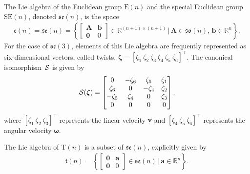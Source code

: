 \begin{example}
    The Lie algebra of the Euclidean group $\text{E}(n)$ and the special Euclidean group $\text{SE}(n)$, denoted $\mathfrak{se}(n)$, is the space
    \begin{align*}
        \mathfrak{e}(n)=\mathfrak{se}(n) = \left\{\begin{bmatrix}
            \mathbf{A} & \mathbf{b} \\ \mathbf{0} & 0
        \end{bmatrix} \in \mathbb{R}^{(n+1)\times(n+1)} \,\biggl|\, \mathbf{A}\in\mathfrak{so}(n),\, \mathbf{b}\in\mathbb{R}^n\right\}.
    \end{align*}
    For the case of $\mathfrak{se}(3)$, elements of this Lie algebra are frequently represented as six-dimensional vectors, called twists, $\boldsymbol{\zeta} = [\zeta_1\ \zeta_2\ \zeta_3\ \zeta_4\ \zeta_5\ \zeta_6]^\top$. The canonical isomorphism $\SL$ is given by
    \begin{align*}
        \SL[\boldsymbol{\zeta}] = \begin{bmatrix}
            0 & -\zeta_6 & \zeta_5 & \zeta_1 \\
            \zeta_6 & 0 & -\zeta_4 & \zeta_2 \\
            -\zeta_5 & \zeta_4 & 0 & \zeta_3 \\
            0 & 0 & 0 & 0
        \end{bmatrix},
    \end{align*}
    where $[\zeta_1\ \zeta_2\ \zeta_3]^\top$ represents the linear velocity $\mathbf{v}$ and $[\zeta_4\ \zeta_5\ \zeta_6]^\top$ represents the angular velocity $\boldsymbol{\omega}$.
\end{example}
\begin{example}
    The Lie algebra of $\text{T}(n)$ is a subset of $\mathfrak{se}(n)$, explicitly given by
    \begin{align*}
        \mathfrak{t}(n) = \left\{\begin{bmatrix}
            \mathbf{0} & \mathbf{a} \\ \mathbf{0} & 0
        \end{bmatrix} \in \mathfrak{se}(n) \,\biggl|\, \mathbf{a}\in\mathbb{R}^n\right\}.
    \end{align*} 
\end{example}
